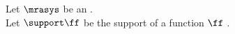 \begin{theorem}
\label{thm:mra_support}
Let $\mrasys$ be an  .\\
Let $\support\ff$ be the support of a function $\ff$ .
\thmbox{
  \support\fphi = \support\fh
  }
\end{theorem}

